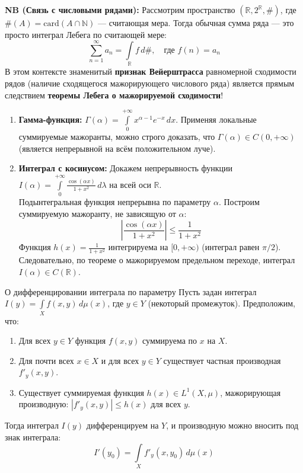 \documentclass[12pt,a4paper]{article}
\begin{document}
\noindent \textbf{NB (Связь с числовыми рядами):} Рассмотрим пространство $(\mathbb{R}, 2^{\mathbb{R}}, \#)$, где $\#(A) = \text{card}(A \cap \mathbb{N})$ — считающая мера. 
Тогда обычная сумма ряда — это просто интеграл Лебега по считающей мере: 
$$ \sum\limits_{n=1}^{\infty} a_n = \int\limits_{\mathbb{R}} f \, d\#, \quad \text{где } f(n) = a_n $$
В этом контексте знаменитый \textbf{признак Вейерштрасса} равномерной сходимости рядов (наличие сходящегося мажорирующего числового ряда) является прямым следствием \textbf{теоремы Лебега о мажорируемой сходимости}!

\begin{Example}
\begin{enumerate}
    \item \textbf{Гамма-функция:} $\Gamma(\alpha) = \int\limits_0^{+\infty} x^{\alpha-1} e^{-x} \, dx$. Применяя локальные суммируемые мажоранты, можно строго доказать, что $\Gamma(\alpha) \in C(0, +\infty)$ (является непрерывной на всём положительном луче).
    \item \textbf{Интеграл с косинусом:} Докажем непрерывность функции $I(\alpha) = \int\limits_0^{+\infty} \frac{\cos(\alpha x)}{1+x^2} \, d\lambda$ на всей оси $\mathbb{R}$. \\
    Подынтегральная функция непрерывна по параметру $\alpha$. Построим суммируемую мажоранту, не зависящую от $\alpha$:
    $$ \left| \frac{\cos(\alpha x)}{1+x^2} \right| \le \frac{1}{1+x^2} $$
    Функция $h(x) = \frac{1}{1+x^2}$ интегрируема на $[0, +\infty)$ (интеграл равен $\pi/2$). Следовательно, по теореме о мажорируемом предельном переходе, интеграл $I(\alpha) \in C(\mathbb{R})$.
\end{enumerate}
\end{Example}



\begin{Theorem}{О дифференцировании интеграла по параметру}{}
Пусть задан интеграл $I(y) = \int\limits_X f(x, y) \, d\mu(x)$, где $y \in Y$ (некоторый промежуток). Предположим, что:
\begin{enumerate}
    \item Для всех $y \in Y$ функция $f(x, y)$ суммируема по $x$ на $X$.
    \item Для почти всех $x \in X$ и для всех $y \in Y$ существует частная производная $f'_y(x,y)$.
    \item Существует суммируемая функция $h(x) \in L^1(X, \mu)$, мажорирующая производную: $|f'_y(x, y)| \le h(x)$ для всех $y$.
\end{enumerate}
Тогда интеграл $I(y)$ дифференцируем на $Y$, и производную можно вносить под знак интеграла:
$$ I'(y_0) = \int\limits_X f'_y(x, y_0) \, d\mu(x) $$
\end{Theorem}
\end{document}
